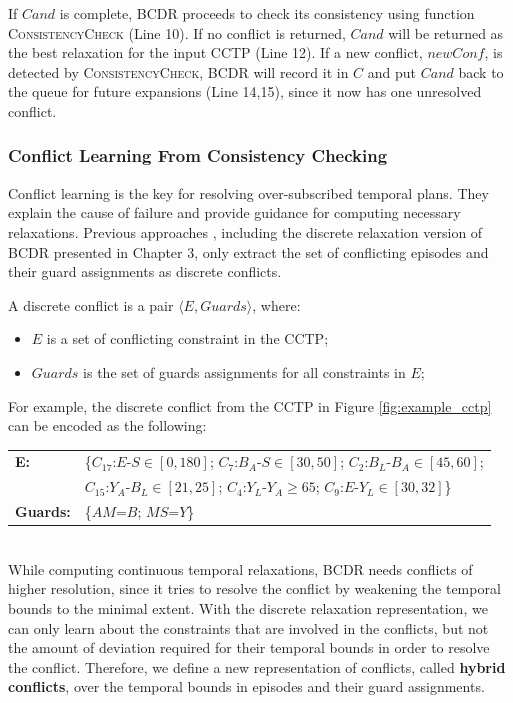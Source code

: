 \documentclass[jair,twoside,11pt,theapa]{article}
\begin{document}
If $\mathit{Cand}$ is complete, BCDR proceeds to check its consistency using function
\textsc{ConsistencyCheck} (Line 10). If no conflict is returned, $\mathit{Cand}$ will be
returned as the best relaxation for the input CCTP (Line 12). If a new conflict,
$\mathit{newConf}$, is detected by \textsc{ConsistencyCheck}, BCDR will record it in $C$
and put $\mathit{Cand}$ back to the queue for future expansions (Line 14,15), since it
now has one unresolved conflict.


\subsubsection{Conflict Learning From Consistency Checking}


Conflict learning is the key for resolving over-subscribed temporal plans. They
explain the cause of failure and provide guidance for computing necessary
relaxations. Previous approaches
\cite{bobby_csail_report_2005,Li05generalizedconflict}, including the discrete
relaxation version of BCDR
presented in Chapter 3, only extract the set of conflicting episodes and their
guard assignments as discrete conflicts.


\begin{mydef}
	A discrete conflict is a pair $\langle E,Guards\rangle$, where:
	\begin{itemize}
		\item $E$ is a set of conflicting constraint in the CCTP;
		\item $Guards$ is the set of guards assignments for all constraints in $E$;
	\end{itemize}
\end{mydef}


For example, the discrete conflict from the CCTP in Figure \ref{fig:example_cctp}
can be encoded as the following:\\

\begin{tabular}{m{2.5cm} m{11cm}}
	\textbf{E:} 	& \{$C_{17}$:$E$-$S\in[0,180]$; $C_7$:$B_A$-$S\in[30,50]$;
	$C_2$:$B_L$-$B_A\in[45,60]$;\\
	& $C_{15}$:$Y_A$-$B_L\in[21,25]$; $C_4$:$Y_L$-$Y_A\geq65$;
	$C_9$:$E$-$Y_L\in[30,32]$\}\\
	\textbf{Guards:} 	& \{$AM$=$B$; $MS$=$Y$\}\\
\end{tabular}\\

While computing continuous temporal relaxations, BCDR needs
conflicts of higher resolution, since it tries to resolve the conflict by
weakening the temporal bounds to the minimal extent. With the discrete
relaxation representation, we
can only learn about the constraints that are involved in the conflicts, but not
the amount of deviation required for their temporal bounds in order to resolve
the conflict. Therefore, we define a new representation of conflicts, called
\textbf{hybrid conflicts}, over the temporal bounds in episodes and their guard
assignments.
\end{document}
